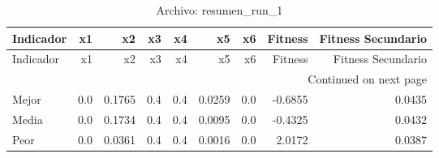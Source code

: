\begin{longtable}{lrrrrrrrr}
\caption{Archivo: resumen\_run\_1}\label{tab:resumen_run_1} \\
\toprule
Indicador & x1 & x2 & x3 & x4 & x5 & x6 & Fitness & Fitness Secundario \\
\midrule
\endfirsthead
\toprule
Indicador & x1 & x2 & x3 & x4 & x5 & x6 & Fitness & Fitness Secundario \\
\midrule
\endhead
\midrule
\multicolumn{9}{r}{Continued on next page} \\
\midrule
\endfoot
\bottomrule
\endlastfoot
Mejor & 0.0 & 0.1765 & 0.4 & 0.4 & 0.0259 & 0.0 & -0.6855 & 0.0435 \\
Media & 0.0 & 0.1734 & 0.4 & 0.4 & 0.0095 & 0.0 & -0.4325 & 0.0432 \\
Peor & 0.0 & 0.0361 & 0.4 & 0.4 & 0.0016 & 0.0 & 2.0172 & 0.0387 \\
\end{longtable}